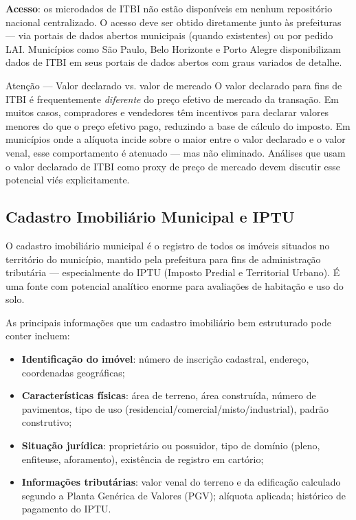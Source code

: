 \textbf{Acesso}: os microdados de ITBI não estão disponíveis em nenhum repositório nacional centralizado. O acesso deve ser obtido diretamente junto às prefeituras --- via portais de dados abertos municipais (quando existentes) ou por pedido LAI. Municípios como São Paulo, Belo Horizonte e Porto Alegre disponibilizam dados de ITBI em seus portais de dados abertos com graus variados de detalhe.

\begin{boxatencao}{Atenção --- Valor declarado vs. valor de mercado}
O valor declarado para fins de ITBI é frequentemente \textit{diferente} do preço efetivo de mercado da transação. Em muitos casos, compradores e vendedores têm incentivos para declarar valores menores do que o preço efetivo pago, reduzindo a base de cálculo do imposto. Em municípios onde a alíquota incide sobre o maior entre o valor declarado e o valor venal, esse comportamento é atenuado --- mas não eliminado. Análises que usam o valor declarado de ITBI como proxy de preço de mercado devem discutir esse potencial viés explicitamente.
\end{boxatencao}

\subsection{Cadastro Imobiliário Municipal e IPTU}

O cadastro imobiliário municipal é o registro de todos os imóveis situados no território do município, mantido pela prefeitura para fins de administração tributária --- especialmente do IPTU (Imposto Predial e Territorial Urbano). É uma fonte com potencial analítico enorme para avaliações de habitação e uso do solo.

As principais informações que um cadastro imobiliário bem estruturado pode conter incluem:

\begin{itemize}
  \item \textbf{Identificação do imóvel}: número de inscrição cadastral, endereço, coordenadas geográficas;
  \item \textbf{Características físicas}: área de terreno, área construída, número de pavimentos, tipo de uso (residencial/comercial/misto/industrial), padrão construtivo;
  \item \textbf{Situação jurídica}: proprietário ou possuidor, tipo de domínio (pleno, enfiteuse, aforamento), existência de registro em cartório;
  \item \textbf{Informações tributárias}: valor venal do terreno e da edificação calculado segundo a Planta Genérica de Valores (PGV); alíquota aplicada; histórico de pagamento do IPTU.
\end{itemize}


